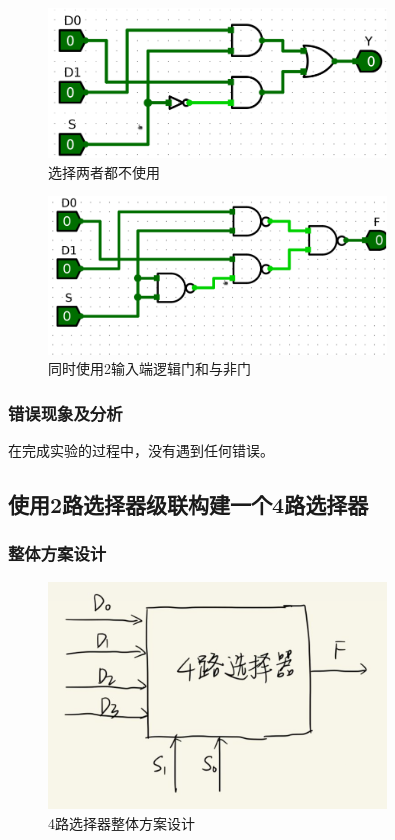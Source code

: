 \documentclass{article}
\begin{document}
    \begin{figure}[H]
    \centering
    \includegraphics[width=0.8\textwidth]{5.2.3.png}
    \caption{选择两者都不使用}
    \end{figure}

    \begin{figure}[H]
    \centering
    \includegraphics[width=0.8\textwidth]{5.2.4.png}
    \caption{同时使用2输入端逻辑门和与非门}
    \end{figure}

    \subsubsection{错误现象及分析}
    在完成实验的过程中，没有遇到任何错误。

    \subsection{使用2路选择器级联构建一个4路选择器}

    \subsubsection{整体方案设计}
    \begin{figure}[H]
    \centering
    \includegraphics[width=0.8\textwidth]{6.1.png}
    \caption{4路选择器整体方案设计}
    \end{figure}
    
\end{document}
